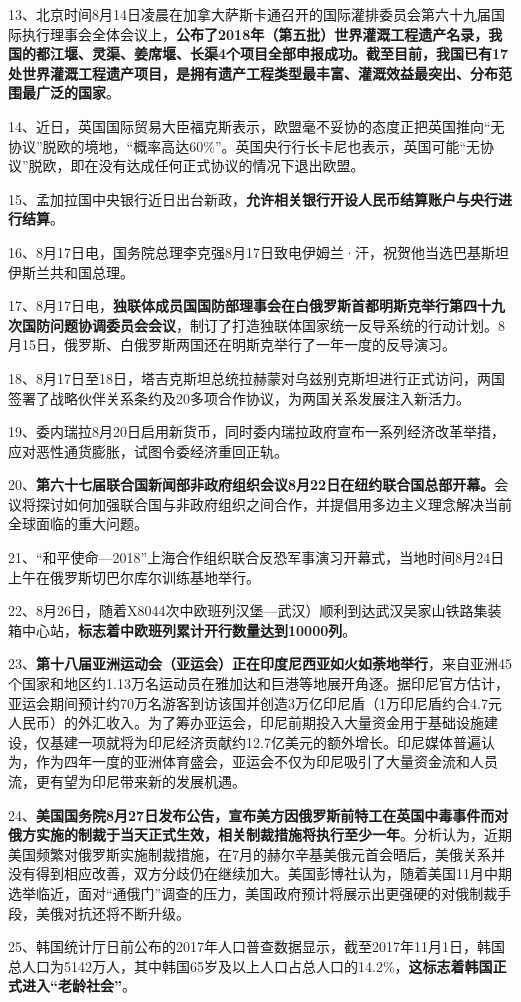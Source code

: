 13、北京时间8月14日凌晨在加拿大萨斯卡通召开的国际灌排委员会第六十九届国际执行理事会全体会议上，{\textbf{公布了2018年（第五批）世界灌溉工程遗产名录，我国的都江堰、灵渠、姜席堰、长渠4个项目全部申报成功。截至目前，我国已有17处世界灌溉工程遗产项目，是拥有遗产工程类型最丰富、灌溉效益最突出、分布范围最广泛的国家}}。

14、近日，英国国际贸易大臣福克斯表示，欧盟毫不妥协的态度正把英国推向``无协议''脱欧的境地，``概率高达60\%''。英国央行行长卡尼也表示，英国可能``无协议''脱欧，即在没有达成任何正式协议的情况下退出欧盟。

15、孟加拉国中央银行近日出台新政，{\textbf{允许相关银行开设人民币结算账户与央行进行结算}}。

16、8月17日电，国务院总理李克强8月17日致电伊姆兰·汗，祝贺他当选巴基斯坦伊斯兰共和国总理。

17、8月17日电，{\textbf{独联体成员国国防部理事会在白俄罗斯首都明斯克举行第四十九次国防问题协调委员会会议}}，制订了打造独联体国家统一反导系统的行动计划。8月15日，俄罗斯、白俄罗斯两国还在明斯克举行了一年一度的反导演习。

18、8月17日至18日，塔吉克斯坦总统拉赫蒙对乌兹别克斯坦进行正式访问，两国签署了战略伙伴关系条约及20多项合作协议，为两国关系发展注入新活力。

19、委内瑞拉8月20日启用新货币，同时委内瑞拉政府宣布一系列经济改革举措，应对恶性通货膨胀，试图令委经济重回正轨。

20、{\textbf{第六十七届联合国新闻部非政府组织会议8月22日在纽约联合国总部开幕。}}会议将探讨如何加强联合国与非政府组织之间合作，并提倡用多边主义理念解决当前全球面临的重大问题。

21、``和平使命---2018''上海合作组织联合反恐军事演习开幕式，当地时间8月24日上午在俄罗斯切巴尔库尔训练基地举行。

22、8月26日，随着X8044次中欧班列汉堡---武汉）顺利到达武汉吴家山铁路集装箱中心站，{\textbf{标志着中欧班列累计开行数量达到10000列}}。

23、{\textbf{第十八届亚洲运动会（亚运会）正在印度尼西亚如火如荼地举行}}，来自亚洲45个国家和地区约1.13万名运动员在雅加达和巨港等地展开角逐。据印尼官方估计，亚运会期间预计约70万名游客到访该国并创造3万亿印尼盾（1万印尼盾约合4.7元人民币）的外汇收入。为了筹办亚运会，印尼前期投入大量资金用于基础设施建设，仅基建一项就将为印尼经济贡献约12.7亿美元的额外增长。印尼媒体普遍认为，作为四年一度的亚洲体育盛会，亚运会不仅为印尼吸引了大量资金流和人员流，更有望为印尼带来新的发展机遇。

24、{\textbf{美国国务院8月27日发布公告，宣布美方因俄罗斯前特工在英国中毒事件而对俄方实施的制裁于当天正式生效，相关制裁措施将执行至少一年}}。分析认为，近期美国频繁对俄罗斯实施制裁措施，在7月的赫尔辛基美俄元首会晤后，美俄关系并没有得到相应改善，双方分歧仍在继续加大。美国彭博社认为，随着美国11月中期选举临近，面对``通俄门''调查的压力，美国政府预计将展示出更强硬的对俄制裁手段，美俄对抗还将不断升级。

25、韩国统计厅日前公布的2017年人口普查数据显示，截至2017年11月1日，韩国总人口为5142万人，其中韩国65岁及以上人口占总人口的14.2\%，{\textbf{这标志着韩国正式进入``老龄社会''}}。
